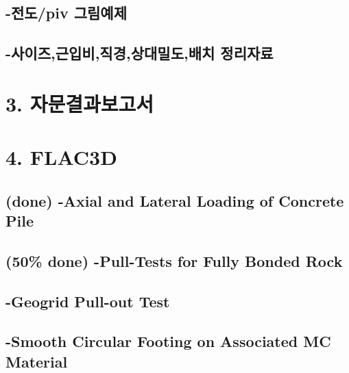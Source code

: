 \documentclass[a4paper, nobind]{templates/ociamthesis}
\begin{document}
\hypertarget{uxc804uxb3c4piv-uxadf8uxb9bcuxc608uxc81c}{%
\subsection{-전도/piv 그림예제}\label{uxc804uxb3c4piv-uxadf8uxb9bcuxc608uxc81c}}

\hypertarget{uxc0acuxc774uxc988uxadfcuxc785uxbe44uxc9c1uxacbduxc0c1uxb300uxbc00uxb3c4uxbc30uxce58-uxc815uxb9acuxc790uxb8cc}{%
\subsection{-사이즈,근입비,직경,상대밀도,배치 정리자료}\label{uxc0acuxc774uxc988uxadfcuxc785uxbe44uxc9c1uxacbduxc0c1uxb300uxbc00uxb3c4uxbc30uxce58-uxc815uxb9acuxc790uxb8cc}}

\hypertarget{uxc790uxbb38uxacb0uxacfcuxbcf4uxace0uxc11c}{%
\section{3. 자문결과보고서}\label{uxc790uxbb38uxacb0uxacfcuxbcf4uxace0uxc11c}}

\hypertarget{flac3d}{%
\section{4. FLAC3D}\label{flac3d}}

\hypertarget{done--axial-and-lateral-loading-of-concrete-pile}{%
\subsection{(done) -Axial and Lateral Loading of Concrete Pile}\label{done--axial-and-lateral-loading-of-concrete-pile}}

\hypertarget{done--pull-tests-for-fully-bonded-rock}{%
\subsection{(50\% done) -Pull-Tests for Fully Bonded Rock}\label{done--pull-tests-for-fully-bonded-rock}}

\hypertarget{geogrid-pull-out-test}{%
\subsection{-Geogrid Pull-out Test}\label{geogrid-pull-out-test}}

\hypertarget{smooth-circular-footing-on-associated-mc-material}{%
\subsection{-Smooth Circular Footing on Associated MC Material}\label{smooth-circular-footing-on-associated-mc-material}}
\end{document}
